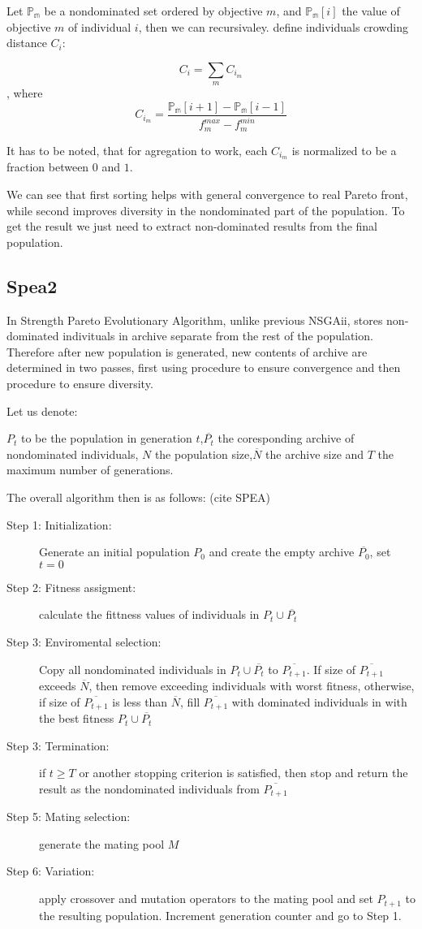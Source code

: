 \documentclass[12pt,oneside,draft]{fithesis2}
\begin{document}
Let $\mathbb{P_m}$ be a nondominated set ordered by objective $m$, and $\mathbb{P_m}[i]$ the value of objective $m$ of individual $i$, then we can recursivaley. define individuals crowding distance $C_i$:

$$C_i = \sum\limits_{m} C_{i_m} $$, where $$C_{i_m} = \frac{\mathbb{P_m}[i+1] - \mathbb{P_m}[i-1]}{f^{max}_m - f^{min}_m}$$

It has to be noted, that for agregation to work, each $C_{i_m}$ is normalized to be a fraction between $0$ and $1$. 

We can see that first sorting helps with general convergence to real Pareto front, while second improves diversity in the nondominated part of the population. To get the result we just need to extract non-dominated results from the final population. 

\subsection{Spea2}
In Strength Pareto Evolutionary Algorithm, unlike previous NSGAii, stores non-dominated indivituals in archive separate from the rest of the population. Therefore after new population is generated, new contents of archive are determined in two passes, first using procedure to ensure convergence and then procedure to ensure diversity.

Let us denote:

$P_t$ to be the population in generation $t$,$\overline{P_t}$ the coresponding archive of nondominated individuals, $N$ the population size,$\overline N$ the archive size and $T$ the maximum number of generations.

The overall algorithm then is as follows: (cite SPEA)

\begin{description}
	\item[Step 1: Initialization:] Generate an initial population $P_0$ and create the empty archive $\overline{P_0}$, set $t=0$
	\item[Step 2: Fitness assigment:] calculate the fittness values of individuals in $P_t \cup \overline{P_t}$
	\item[Step 3: Enviromental selection:] Copy all nondominated individuals in $P_t \cup \overline{P_t}$ to $\overline{P_{t+1}}$. If size of $\overline{P_{t+1}}$ exceeds $\overline N$, then remove exceeding individuals with worst fitness, otherwise, if size of $\overline{P_{t+1}}$ is less than $\overline N$, fill $\overline{P_{t+1}}$ with dominated individuals in  with the best fitness $P_t \cup \overline{P_t}$
	\item[Step 3: Termination:] if $t \geq T$ or another stopping criterion is satisfied, then stop and return the result as the nondominated individuals from $\overline{P_{t+1}}$
	\item[Step 5: Mating selection:] generate the mating pool $M$
	\item[Step 6: Variation:] apply crossover and mutation operators to the mating pool and set $P_{t+1}$ to the resulting population. Increment generation counter and go to Step 1.
\end{description}
\end{document}
